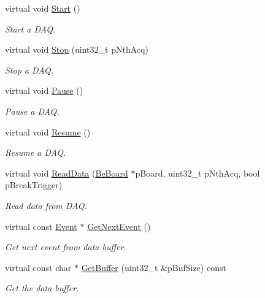 \begin{DoxyCompactItemize}
virtual void \hyperlink{class_ph2___hw_interface_1_1_be_board_f_w_interface_a2835dae7ec6788c1d5728e53f9c3051a}{Start} ()
\begin{DoxyCompactList}\small\item\em Start a D\-A\-Q. \end{DoxyCompactList}\item 
virtual void \hyperlink{class_ph2___hw_interface_1_1_be_board_f_w_interface_af7825e291796f7c8c498a92365583e08}{Stop} (uint32\-\_\-t p\-Nth\-Acq)
\begin{DoxyCompactList}\small\item\em Stop a D\-A\-Q. \end{DoxyCompactList}\item 
virtual void \hyperlink{class_ph2___hw_interface_1_1_be_board_f_w_interface_afb21d1663b328272c12cab6970114ecd}{Pause} ()
\begin{DoxyCompactList}\small\item\em Pause a D\-A\-Q. \end{DoxyCompactList}\item 
virtual void \hyperlink{class_ph2___hw_interface_1_1_be_board_f_w_interface_aafa48fcae2c37040141afc89113881e5}{Resume} ()
\begin{DoxyCompactList}\small\item\em Resume a D\-A\-Q. \end{DoxyCompactList}\item 
virtual void \hyperlink{class_ph2___hw_interface_1_1_be_board_f_w_interface_af27f2a01b7625d2b144760413128acf2}{Read\-Data} (\hyperlink{class_ph2___hw_description_1_1_be_board}{Be\-Board} $\ast$p\-Board, uint32\-\_\-t p\-Nth\-Acq, bool p\-Break\-Trigger)
\begin{DoxyCompactList}\small\item\em Read data from D\-A\-Q. \end{DoxyCompactList}\item 
virtual const \hyperlink{class_ph2___hw_interface_1_1_event}{Event} $\ast$ \hyperlink{class_ph2___hw_interface_1_1_be_board_f_w_interface_a5f524d2a377db09667de71563e0fab3d}{Get\-Next\-Event} ()
\begin{DoxyCompactList}\small\item\em Get next event from data buffer. \end{DoxyCompactList}\item 
virtual const char $\ast$ \hyperlink{class_ph2___hw_interface_1_1_be_board_f_w_interface_a6a69e40bd11c9fb08a2accba2a5bed82}{Get\-Buffer} (uint32\-\_\-t \&p\-Buf\-Size) const 
\begin{DoxyCompactList}\small\item\em Get the data buffer. \end{DoxyCompactList}\end{DoxyCompactItemize}
